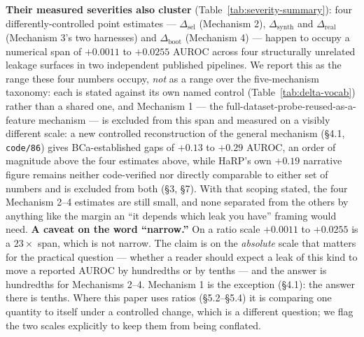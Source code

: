 \documentclass[10pt]{article} %
\begin{document}
\textbf{Their measured severities also cluster}
(Table~\ref{tab:severity-summary}): four differently-controlled point
estimates --- $\Delta_{\text{sel}}$ (Mechanism 2), $\Delta_{\text{synth}}$ and
$\Delta_{\text{real}}$ (Mechanism 3's two harnesses) and $\Delta_{\text{boot}}$
(Mechanism 4) --- happen to occupy a numerical span of $+0.0011$ to $+0.0255$
AUROC across four structurally unrelated leakage surfaces in two independent
published pipelines. We report this as the range these four numbers occupy,
\emph{not} as a range over the five-mechanism taxonomy: each is stated against
its own named control (Table~\ref{tab:delta-vocab}) rather than a shared one,
and Mechanism 1 --- the full-dataset-probe-reused-as-a-feature mechanism --- is
excluded from this span and measured on a visibly different scale: a new
controlled reconstruction of the general mechanism (§4.1, \texttt{code/86})
gives BCa-established gaps of $+0.13$ to $+0.29$ AUROC, an order of magnitude
above the four estimates above, while HaRP's own $+0.19$ narrative figure
remains neither code-verified nor directly comparable to either set of numbers
and is excluded from both (§3, §7). With that scoping stated, the four
Mechanism 2--4 estimates are still
small, and none separated from the others by
anything like the margin an ``it depends which leak you have'' framing would
need. \textbf{A caveat on the word ``narrow.''} On a ratio scale $+0.0011$ to
$+0.0255$ is a $23\times$ span, which is not narrow. The claim is on the
\emph{absolute} scale that matters for the practical question --- whether a
reader should expect a leak of this kind to move a reported AUROC by hundredths
or by tenths --- and the answer is hundredths for Mechanisms 2--4. Mechanism 1
is the exception (§4.1): the answer there is tenths. Where
this paper uses ratios (§5.2--§5.4) it is comparing one quantity to itself under
a controlled change, which is a different question; we flag the two scales
explicitly to keep them from being conflated.
\end{document}
